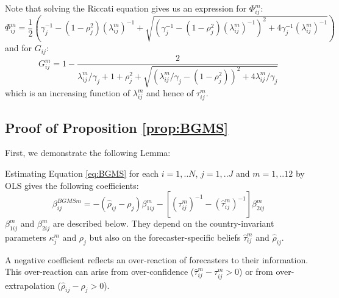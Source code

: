 Note that solving the Riccati equation gives us an expression for $\Phi_{ij}^m$:
\begin{equation}\Phi_{ij}^m=\frac{1}{2}\left(\gamma_j^{-1}-(1-\rho_j^2)(\lambda_{ij}^m)^{-1}+\sqrt{(\gamma_j^{-1}-(1-\rho_j^2)(\lambda_{ij}^m)^{-1})^2+4\gamma_j^{-1}(\lambda_{ij}^m)^{-1}}\right)\label{eq:Phi}\end{equation}
and for $G_{ij}$:
$$G_{ij}^m=1-\frac{2}{\lambda_{ij}^m/\gamma_j+1+\rho_j^2+\sqrt{(\lambda_{ij}^m/\gamma_j-(1-\rho_j^2))^2+4\lambda_{ij}^m/\gamma_j}}$$
which is an increasing function of $\lambda_{ij}^m$ and hence of $\tau_{ij}^m$.


\subsection{Proof of Proposition \ref{prop:BGMS}}
\label{proof:BGMS}

First, we demonstrate the following Lemma:
\begin{lemma}\label{lemma:BGMS} Estimating Equation \eqref{eq:BGMS} for each $i=1,..N$, $j=1,..J$ and $m=1,..12$ by OLS gives the following coefficients:
$$\beta^{BGMSm}_{ij}=-(\hat\rho_{ij}-\rho_j)\beta_{1ij}^m - [(\tau_{ij}^m)^{-1}-(\hat\tau_{ij}^m)^{-1}]\beta_{2ij}^m$$
$\beta_{1ij}^m$ and $\beta_{2ij}^m$ are described below. They depend on the country-invariant parameters $\kappa_j^m$ and $\rho_j$ but also on the forecaster-specific beliefs $\hat\tau_{ij}^m$ and $\hat\rho_{ij}$.
\end{lemma}
A negative coefficient reflects an over-reaction of forecasters to their information. This over-reaction can arise from over-confidence ($\hat\tau_{ij}^m-\tau_{ij}^m>0$) or from over-extrapolation ($\hat\rho_{ij} -\rho_j>0$).

